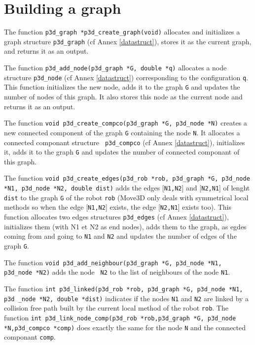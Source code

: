 \section{Building a graph}

The function {\tt p3d\_graph *p3d\_create\_graph(void)}
 allocates and
initializes a graph structure {\tt p3d\_graph} (cf Annex \ref{datastruct}), stores it
as the current graph, and returns it as an output.

The function {\tt p3d\_add\_node(p3d\_graph *G, double *q)}
 allocates
a node structure {\tt p3d\_node} (cf Annex \ref{datastruct})
corresponding to the configuration {\tt q}. This function initializes
the new node, adds it to the graph {\tt G} and updates the number of
nodes of this graph. It also stores this node as the current node and
returns it as an output.

The function {\tt void p3d\_create\_compco(p3d\_graph *G, p3d\_node
*N)}  creates a new connected component of the graph {\tt G} containing
the node {\tt N}. It allocates a connected componant structure {\tt
p3d\_compco} (cf Annex \ref{datastruct}), initializes it, adds it to
the graph {\tt G} and updates the number of connected componant of this
graph. 

The function {\tt void p3d\_create\_edges(p3d\_rob *rob, p3d\_graph
*G, p3d\_node *N1, p3d\_node *N2, double dist)}
 adds the edges
[{\tt N1,N2}] and [{\tt N2,N1}] of lenght {\tt dist} to the graph {\tt G} of the robot {\tt rob}
(Move3D only deals with symmetrical local methods so when the edge
[{\tt N1,N2}] exists, the edge [{\tt N2,N1}] exists too). This function
allocates two edges structures {\tt p3d\_edges} (cf Annex
\ref{datastruct}), initializes them (with N1 et N2 as end nodes),
adds them to the graph, as egdes coming from and going to {\tt N1} and
{\tt N2} and updates the number of edges of the graph {\tt G}.

The function {\tt void p3d\_add\_neighbour(p3d\_graph *G, p3d\_node
*N1, p3d\_node *N2)}  adds the node {\tt
N2} to the list of neighbours of the node {\tt N1}.

The function {\tt int p3d\_linked(p3d\_rob *rob, p3d\_graph *G, p3d\_node
*N1, p3d \_node *N2, double *dist)}  indicates if the nodes {\tt N1} and
{\tt N2} are linked by a collision free path built by the current
local method of the robot {\tt rob}. The function {\tt int
p3d\_link\_node\_comp(p3d\_rob *rob,p3d\_graph *G, p3d\_node
*N,p3d\_compco *comp)}  does exactly the
same for the node {\tt N} and the connected componant {\tt comp}.

